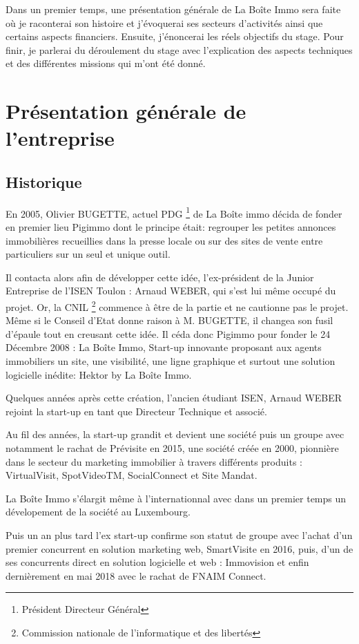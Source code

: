 \documentclass[12pt]{article}
\begin{document}
Dans un premier temps, une présentation générale de La Boîte Immo sera faite où je raconterai son histoire et j'évoquerai ses secteurs d'activités ainsi que certains aspects financiers.
Ensuite, j'énoncerai les réels objectifs du stage.
Pour finir, je parlerai du déroulement du stage avec l'explication des aspects techniques et des différentes missions qui m'ont été donné.
\newpage

\setcounter{secnumdepth}{3}
\section{Présentation générale de l'entreprise}
\subsection{Historique}

En 2005,  Olivier BUGETTE, actuel PDG \footnote{Président Directeur Général} de La Boîte immo décida de fonder en premier lieu Pigimmo dont le principe était: regrouper les petites annonces immobilières recueillies dans la presse locale ou sur des sites de vente entre particuliers sur un seul et unique outil. 

Il contacta alors afin de développer cette idée, l'ex-président de la Junior Entreprise de l'ISEN Toulon : Arnaud WEBER, qui s'est lui même occupé du projet.
Or, la CNIL \footnote{Commission nationale de l'informatique et des libertés} commence à être de la partie et ne cautionne pas le projet. Même si le Conseil d’Etat donne raison à M. BUGETTE, il changea son fusil d’épaule tout en creusant cette idée. 
Il céda donc Pigimmo pour fonder le 24 Décembre 2008 : La Boîte Immo, Start-up innovante proposant aux agents immobiliers un site, une visibilité, une ligne graphique et surtout une solution logicielle inédite: Hektor by La Boîte Immo.

Quelques années après cette création, l'ancien étudiant ISEN, Arnaud WEBER rejoint la start-up en tant que Directeur Technique et associé.

Au fil des années, la start-up grandit et devient une société puis un groupe avec notamment le rachat de Prévisite en 2015, une société créée en 2000, pionnière dans le secteur du marketing immobilier à travers différents produits : VirtualVisit, SpotVideoTM, SocialConnect et Site Mandat.

La Boîte Immo s'élargit même à l'internationnal avec dans un premier temps un dévelopement de la société au Luxembourg.

Puis un an plus tard l'ex start-up confirme son statut de groupe avec l'achat d'un premier concurrent en solution marketing web, SmartVisite en 2016, puis, d'un de ses concurrents direct en solution logicielle et web : Immovision et enfin dernièrement en mai 2018 avec le rachat de FNAIM Connect.
\end{document}
